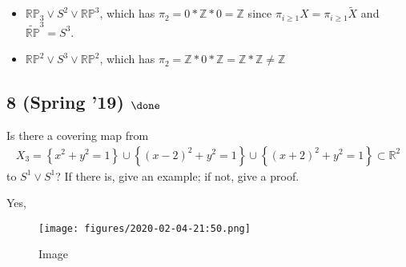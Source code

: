 
\begin{solution}

\hfill

\begin{concept}

\hfill

\end{concept}

\begin{itemize}
\tightlist
\item
  \({\mathbb{RP}}_3 \vee S^2 \vee {\mathbb{RP}}^3\), which has
  \(\pi_2 = 0 \ast {\mathbb{Z}}\ast 0 = {\mathbb{Z}}\) since
  \(\pi_{i\geq 1} X = \pi_{i\geq 1}\tilde X\) and
  \(\tilde {\mathbb{RP}}^3 = S^3\).
\item
  \({\mathbb{RP}}^2 \vee S^3 \vee {\mathbb{RP}}^2\), which has
  \(\pi_2 = {\mathbb{Z}}\ast 0 \ast {\mathbb{Z}}= {\mathbb{Z}}\ast {\mathbb{Z}}\neq {\mathbb{Z}}\)
\end{itemize}

\end{solution}

\hypertarget{spring-19-done}{%
\subsection{\texorpdfstring{8 (Spring '19)
\(\done\)}{8 (Spring '19) \textbackslash done}}\label{spring-19-done}}

Is there a covering map from
\begin{align*}
X_3 = \left\{{x^2 + y^2 = 1}\right\} \cup \left\{{(x - 2)^2 + y^2 = 1}\right\} \cup \left\{{(x + 2)^2 + y^2 = 1}\right\} \subset {\mathbb{R}}^2
\end{align*}
to \(S^1 \vee S^1\)? If there is, give an example; if not, give a proof.

\begin{solution}

\hfill

\begin{concept}

\hfill

\end{concept}

Yes,

\begin{figure}
\centering
\texttt{[image: figures/2020-02-04-21:50.png]}
\caption{Image}
\end{figure}

\end{solution}

